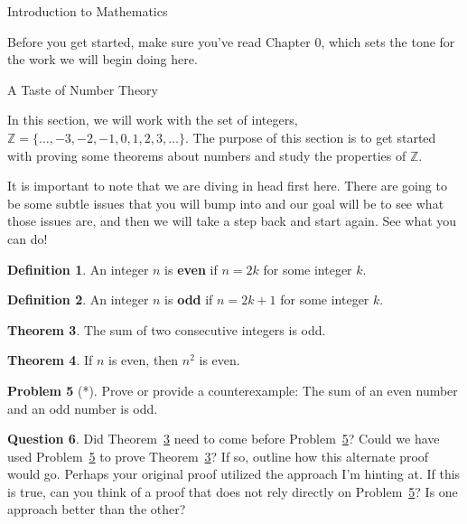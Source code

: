 \documentclass[11pt]{article}
\theoremstyle{definition}
\newtheorem{theorem}{Theorem}[section]
\newtheorem{question}[theorem]{Question}
\newtheorem{definition}[theorem]{Definition}
\newtheorem{problem}[theorem]{Problem}
\begin{document}
\addtocounter{section}{0}

\begin{section}{Introduction to Mathematics}

Before you get started, make sure you've read Chapter 0, which sets the tone for the work we will begin doing here.

\begin{subsection}{A Taste of Number Theory}


In this section, we will work with the set of integers, $\mathbb{Z} = \{\ldots, -3, -2, -1, 0, 1, 2, 3, \ldots\}$.  The purpose of this section is to get started with proving some theorems about numbers and study the properties of $\mathbb{Z}$.

It is important to note that we are diving in head first here.  There are going to be some subtle issues that you will bump into and our goal will be to see what those issues are, and then we will take a step back and start again.  See what you can do!

\begin{definition}
An integer $n$ is \textbf{even} if $n=2k$ for some integer $k$. \end{definition}

\begin{definition}
An integer $n$ is \textbf{odd} if $n=2k+1$ for some integer $k$. \end{definition}

\begin{theorem}\label{two consecutive ints}
The sum of two consecutive integers is odd.
\end{theorem}

\begin{theorem}
If $n$ is even, then $n^2$ is even.
\end{theorem}

\begin{problem}[*]\label{sum of even and odd}
Prove or provide a counterexample:  The sum of an even number and an odd number is odd.
\end{problem}

\begin{question}
Did Theorem~\ref{two consecutive ints} need to come before Problem~\ref{sum of even and odd}?  Could we have used Problem~\ref{sum of even and odd} to prove Theorem~\ref{two consecutive ints}?  If so, outline how this alternate proof would go.  Perhaps your original proof utilized the approach I'm hinting at.  If this is true, can you think of a proof that does not rely directly on Problem~\ref{sum of even and odd}?  Is one approach better than the other?
\end{question}


\end{subsection}
\end{section}
\end{document}
